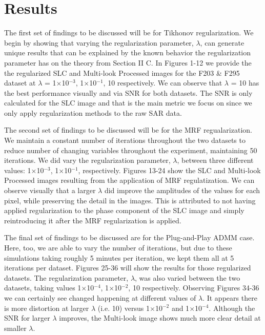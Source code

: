 \documentclass[conference]{IEEEtran}
\begin{document}
\section{Results}
\par The first set of findings to be discussed will be for Tikhonov regularization. We begin by showing that varying the regularization parameter, $\lambda$, can generate unique results that can be explained by the known behavior the regularization parameter has on the theory from Section II C. In Figures 1-12 we provide the the regularized SLC and Multi-look Processed images for the F203 \& F295 dataset at $\lambda$ = 1$\times$10$^{-3}$, 1$\times$10$^{-1}$, 10 respectively. We can observe that $\lambda$ = 10 has the best performance visually and via SNR for both datasets. The SNR is only calculated for the SLC image and that is the main metric we focus on  since we only apply regularization methods to the raw SAR data. 
\par The second set of findings to be discussed will be for the MRF regualarization. We maintain a constant number of iterations throughout the two datasets to reduce number of changing variables throughout the experiment, maintaining 50 iterations. We did vary the regularization parameter, $\lambda$, between three different values: 1$\times$10$^{-3}$, 1$\times$10$^{-1}$, respectively. Figures 13-24 show the SLC and Multi-look Processed images resulting from the application of MRF regulatization. We can observe visually that a larger $\lambda$ did improve the amplitudes of the values for each pixel, while preserving the detail in the images. This is attributed to not having applied regularization to the phase component of the SLC image and simply reintroducing it after the MRF regularization is applied.
\par The final set of findings to be discussed are for the Plug-and-Play ADMM case. Here, too, we are able to vary the number of iterations, but due to these simulations taking roughly 5 minutes per iteration, we kept them all at 5 iterations per dataset. Figures 25-36 will show the results for those regularized datasets. The regularization parameter, $\lambda$, was also varied between the two datasets, taking values 1$\times$10$^{-4}$, 1$\times$10$^{-2}$, 10 respectively. Observing Figures 34-36 we can certainly see changed happening at different values of $\lambda$. It appears there is more distortion at larger $\lambda$ (i.e. 10) versus 1$\times$10$^{-2}$ and 1$\times$10$^{-4}$. Although the SNR for larger $\lambda$ improves, the Multi-look image shows much more clear detail at smaller $\lambda$. 
\end{document}

